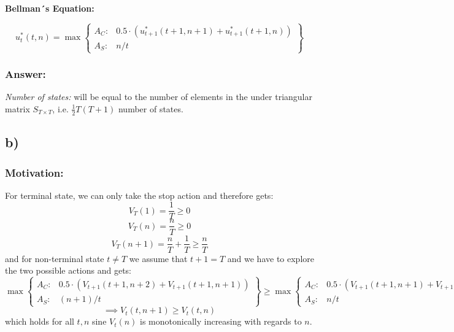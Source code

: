 \documentclass{article}
\begin{document}
\textbf{Bellman´s Equation:}

\begin{equation}
    u_{t}^{*}(t,n) = \max
    \left\{\begin{matrix}
    A_C: &  0.5 \cdot\left( u_{t+1}^{*}\left(t+1 ,n+1\right) + u_{t+1}^{*}\left(t+1 ,n\right)\right)\\
    A_S: &  n/t
    \end{matrix}\right\}
\end{equation}

\subsubsection*{Answer:}
\textit{Number of states:} will be equal to the number of elements in the under triangular matrix $S_{T\times T}$, i.e. $\frac{1}{2}T(T+1)$ number of states.

\subsection*{b)}
\subsubsection*{Motivation:}

For terminal state, we can only take the stop action and therefore gets:
\begin{equation*}
    V_{T}(1) = \frac{1}{T}\geq 0
\end{equation*}
\begin{equation*}
    V_{T}(n) = \frac{n}{T}\geq 0
\end{equation*}
\begin{equation*}
    V_{T}(n+1) = \frac{n}{T} + \frac{1}{T} \geq \frac{n}{T}
\end{equation*}
and for non-terminal state $t\ne T$ we assume that $t+1=T$ and we have to explore the two possible actions and gets:
\begin{equation*}
    \max
    \left\{\begin{matrix}
    A_C: &  0.5 \cdot\left( V_{t+1}\left(t+1 ,n + 2\right) + V_{t+1}\left(t+1 ,n + 1\right)\right)\\
    A_S: &  (n+1)/t
    \end{matrix}\right\} \geq 
    \max
    \left\{\begin{matrix}
    A_C: &  0.5 \cdot\left( V_{t+1}\left(t+1 ,n+1\right) + V_{t+1}\left(t+1 ,n\right)\right)\\
    A_S: &  n/t
    \end{matrix}\right\}
\end{equation*}
\begin{equation*}
    \implies V_{t}(t,n+1) \geq  V_{t}(t,n) 
\end{equation*}
which holds for all $t,n$ sine $V_t(n)$ is monotonically increasing with regards to $n$.
\end{document}
